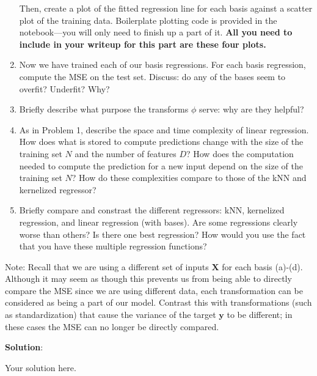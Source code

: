 \documentclass[submit]{../harvardml}
\newenvironment{solution}{
    \vspace{2mm}
    \color{blue}\noindent\textbf{Solution}:
}{}
\begin{document}
\begin{problem}
\begin{enumerate}
        Then, create a plot of the fitted
        regression line for each basis against a scatter plot
        of the training data. Boilerplate plotting code is provided in the
        notebook---you will only need to finish up a part of it.
        \textbf{All you need to include
          in your writeup for this part are these four plots.}

        \item
          Now we have trained each of our basis regressions. For each basis
          regression, compute the MSE on the test set.  Discuss: do any of the
          bases seem to overfit?  Underfit?  Why?


    \item Briefly describe what purpose the transforms $\phi$ serve: why are they helpful?

    \item As in Problem 1, describe the space and time complexity of linear regression.  How does what is stored to compute predictions change with the size of the training set $N$ and the number of features $D$?  How does the computation needed to compute the prediction for a new input depend on the size of the training set $N$?  How do these complexities compare to those of the kNN and kernelized regressor?

    \item Briefly compare and constrast the different regressors: kNN,
          kernelized regression, and linear regression (with bases).  Are some
          regressions clearly worse than others?  Is there one best
          regression?  How would you use the fact that you have these multiple
          regression functions?

  \end{enumerate}
  Note:
  Recall that we are using a
  different set of inputs $\mathbf{X}$ for each basis (a)-(d).
  Although it may seem as though this prevents us from being able
  to directly compare the MSE since we are using different data,
  each transformation can be considered as being a part of our model.
  Contrast this with transformations (such as standardization) that cause the variance of the target $\mathbf{y}$ to be different; in these cases the
  MSE can no longer be directly compared.
\end{problem}

\newpage 
\begin{solution}
	Your solution here.
\end{solution}
\end{document}
